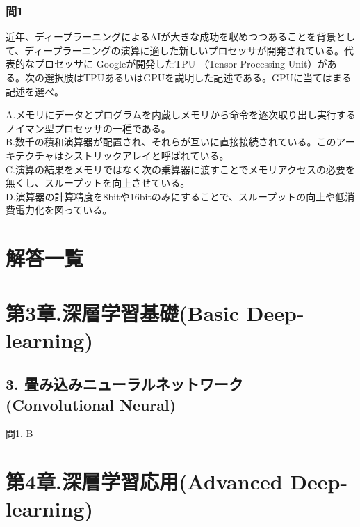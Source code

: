 \documentclass[
  letterpaper,
  DIV=11,
  numbers=noendperiod]{scrreprt}
\begin{document}
\subsection{問1}\label{ux554f1-8}

近年、ディープラーニングによるAIが大きな成功を収めつつあることを背景として、ディープラーニングの演算に適した新しいプロセッサが開発されている。代表的なプロセッサに
Googleが開発したTPU （Tensor Processing
Unit）がある。次の選択肢はTPUあるいはGPUを説明した記述である。GPUに当てはまる記述を選べ。

A.メモリにデータとプログラムを内蔵しメモリから命令を逐次取り出し実行するノイマン型プロセッサの一種である。\\
B.数千の積和演算器が配置され、それらが互いに直接接続されている。このアーキテクチャはシストリックアレイと呼ばれている。\\
C.演算の結果をメモリではなく次の乗算器に渡すことでメモリアクセスの必要を無くし、スループットを向上させている。\\
D.演算器の計算精度を8bitや16bitのみにすることで、スループットの向上や低消費電力化を図っている。


\chapter{解答一覧}\label{ux89e3ux7b54ux4e00ux89a7}


\chapter{第3章.深層学習基礎(Basic
Deep-learning)}\label{ux7b2c3ux7ae0.ux6df1ux5c64ux5b66ux7fd2ux57faux790ebasic-deep-learning}

\section{3. 畳み込みニューラルネットワーク (Convolutional
Neural)}\label{ux7573ux307fux8fbcux307fux30cbux30e5ux30fcux30e9ux30ebux30cdux30c3ux30c8ux30efux30fcux30af-convolutional-neural-1}

問1. B


\chapter{第4章.深層学習応用(Advanced
Deep-learning)}\label{ux7b2c4ux7ae0.ux6df1ux5c64ux5b66ux7fd2ux5fdcux7528advanced-deep-learning-1}
\end{document}
